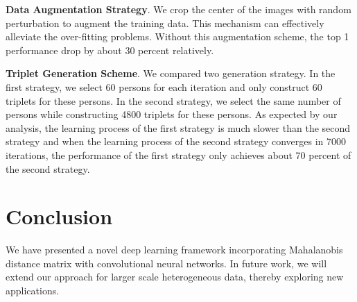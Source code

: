 \documentclass[letterpaper]{article}
\begin{document}
\textbf{Data Augmentation Strategy}. We crop the center of the images with random perturbation to augment the training data. This mechanism can effectively alleviate the over-fitting problems. Without this augmentation scheme, the top 1 performance drop by about 30 percent relatively.

\textbf{Triplet Generation Scheme}. We compared two generation strategy. In the first strategy, we select 60 persons for each iteration and only construct 60 triplets for these persons. In the second strategy, we select the same number of persons while constructing 4800 triplets for these persons. As expected by our analysis, the learning process of the first strategy is much slower than the second strategy and when the learning process of the second strategy converges in 7000 iterations, the performance of the first strategy only achieves about 70 percent of the second strategy.


\section{Conclusion}

We have presented a novel deep learning framework incorporating Mahalanobis distance matrix with convolutional neural networks.  In future work, we will extend our approach for larger scale heterogeneous data, thereby exploring new applications.



\end{document}
